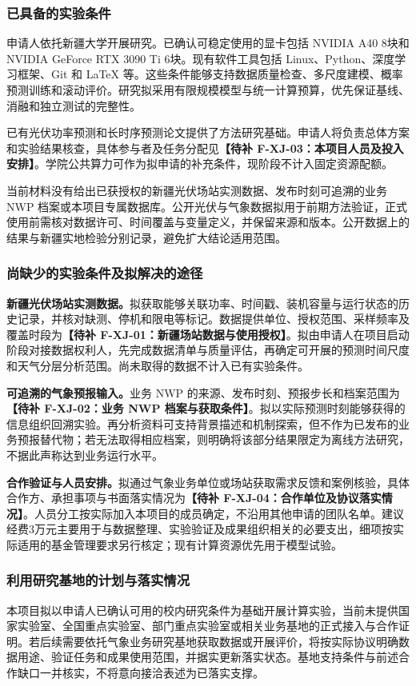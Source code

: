 \justifying
\NSFCBodyText

\subsubsection{已具备的实验条件}
申请人依托新疆大学开展研究。已确认可稳定使用的显卡包括 NVIDIA A40 8块和 NVIDIA GeForce RTX 3090 Ti 6块。现有软件工具包括 Linux、Python、深度学习框架、Git 和 LaTeX 等。这些条件能够支持数据质量检查、多尺度建模、概率预测训练和滚动评价。研究拟采用有限规模模型与统一计算预算，优先保证基线、消融和独立测试的完整性。

已有光伏功率预测和长时序预测论文提供了方法研究基础。申请人将负责总体方案和实验结果核查，具体参与者及任务分配见\textbf{【待补 F-XJ-03：本项目人员及投入安排】}。学院公共算力可作为拟申请的补充条件，现阶段不计入固定资源配额。

当前材料没有给出已获授权的新疆光伏场站实测数据、发布时刻可追溯的业务 NWP 档案或本项目专属数据库。公开光伏与气象数据拟用于前期方法验证，正式使用前需核对数据许可、时间覆盖与变量定义，并保留来源和版本。公开数据上的结果与新疆实地检验分别记录，避免扩大结论适用范围。

\subsubsection{尚缺少的实验条件及拟解决的途径}
\textbf{新疆光伏场站实测数据。}拟获取能够关联功率、时间戳、装机容量与运行状态的历史记录，并核对缺测、停机和限电等标记。数据提供单位、授权范围、采样频率及覆盖时段为\textbf{【待补 F-XJ-01：新疆场站数据与使用授权】}。拟由申请人在项目启动阶段对接数据权利人，先完成数据清单与质量评估，再确定可开展的预测时间尺度和天气分层分析范围。尚未取得的数据不计入已有实验条件。

\textbf{可追溯的气象预报输入。}业务 NWP 的来源、发布时刻、预报步长和档案范围为\textbf{【待补 F-XJ-02：业务 NWP 档案与获取条件】}。拟以实际预测时刻能够获得的信息组织回溯实验。再分析资料可支持背景描述和机制探索，但不作为已发布的业务预报替代物；若无法取得相应档案，则明确将该部分结果限定为离线方法研究，不据此声称达到业务运行水平。

\textbf{合作验证与人员安排。}拟通过气象业务单位或场站获取需求反馈和案例核验，具体合作方、承担事项与书面落实情况为\textbf{【待补 F-XJ-04：合作单位及协议落实情况】}。人员分工按实际加入本项目的成员确定，不沿用其他申请的团队名单。建议经费3万元主要用于与数据整理、实验验证及成果组织相关的必要支出，细项按实际适用的基金管理要求另行核定；现有计算资源优先用于模型试验。

\subsubsection{利用研究基地的计划与落实情况}
本项目拟以申请人已确认可用的校内研究条件为基础开展计算实验，当前未提供国家实验室、全国重点实验室、部门重点实验室或相关业务基地的正式接入与合作证明。若后续需要依托气象业务研究基地获取数据或开展评价，将按实际协议明确数据用途、验证任务和成果使用范围，并据实更新落实状态。基地支持条件与前述合作缺口一并核实，不将意向接洽表述为已落实支撑。
